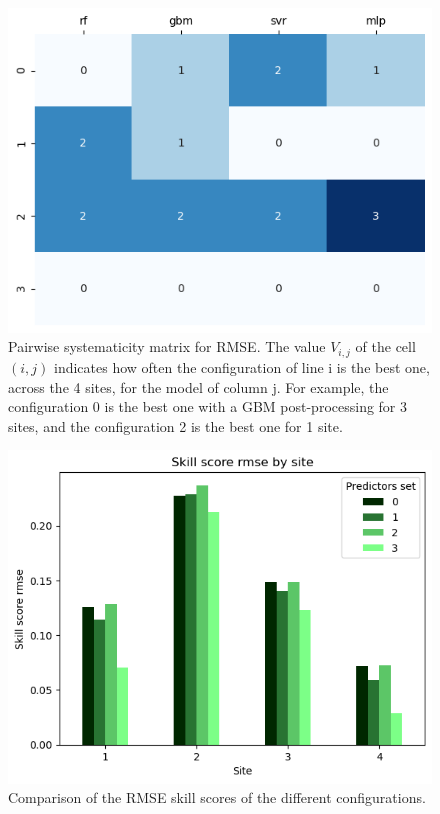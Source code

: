 \begin{figure}[htb!]
    \centering
    \includegraphics[width=\columnwidth]{figures/first_study/comp_predictors_rmse.png}
\caption{Pairwise systematicity matrix for RMSE. The value $V_{i,j}$ of
 the cell $(i,j)$ indicates how often the configuration of line i is the best one, across 
 the 4 sites, for the model of column j. For example, the configuration 0 is the best one
 with a GBM post-processing for 3 sites, and the configuration 2 is the best one for 1 site.}
\end{figure}

\begin{figure}[htb!]
    \centering
    \includegraphics[width=\columnwidth]{figures/first_study/comp_predictors_rmse_mlp.png}
\caption{Comparison of the RMSE skill scores of the different configurations.}
\end{figure}

